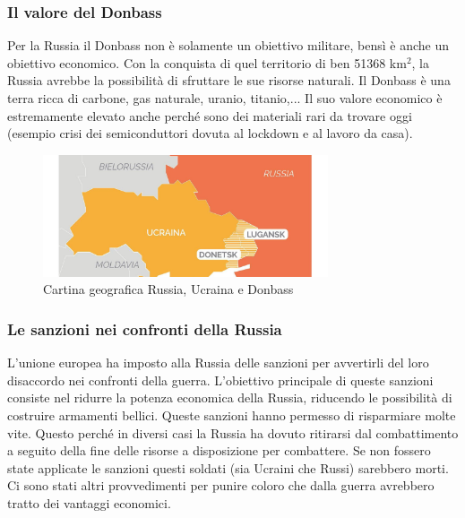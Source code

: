 \documentclass[a4paper, 12pt]{article}
\begin{document}

\subsubsection{Il valore del Donbass}

Per la Russia il Donbass non è solamente un obiettivo militare, bensì è anche un obiettivo economico. Con la conquista di quel territorio di ben 51368 km$^2$, la Russia avrebbe la possibilità di sfruttare le sue risorse naturali. Il Donbass è una terra ricca di carbone, gas naturale, uranio, titanio,... Il suo valore economico è estremamente elevato anche perché sono dei materiali rari da trovare oggi (esempio crisi dei semiconduttori dovuta al lockdown e al lavoro da casa).

\begin{figure}[h]
    \centering
    \includegraphics[width=0.75\textwidth]{images/map.jpg}
    \caption{Cartina geografica Russia, Ucraina e Donbass}
\end{figure}



\pagebreak

\subsubsection{Le sanzioni nei confronti della Russia}

L'unione europea ha imposto alla Russia delle sanzioni per avvertirli del loro disaccordo nei confronti della guerra. L'obiettivo principale di queste sanzioni consiste nel ridurre la potenza economica della Russia, riducendo le possibilità di costruire armamenti bellici. Queste sanzioni hanno permesso di risparmiare molte vite. Questo perché in diversi casi la Russia ha dovuto ritirarsi dal combattimento a seguito della fine delle risorse a disposizione per combattere. Se non fossero state applicate le sanzioni questi soldati (sia Ucraini che Russi) sarebbero morti. Ci sono stati altri provvedimenti per punire coloro che dalla guerra avrebbero tratto dei vantaggi economici.
\end{document}

